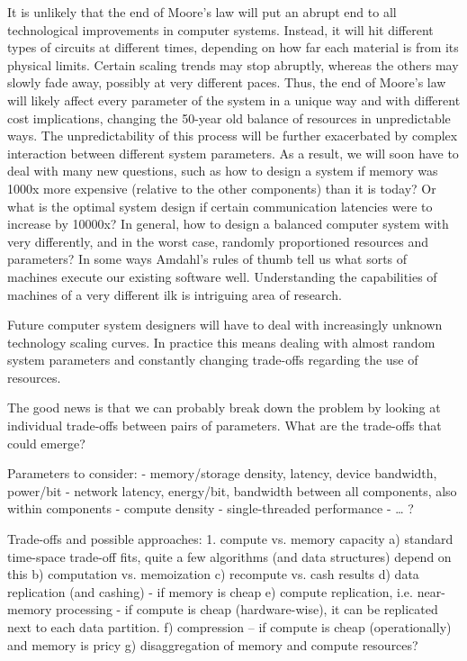 It is unlikely that the end of Moore's law will put an abrupt end to all technological improvements in computer systems. Instead, it will hit different types of circuits at different times, depending on how far each material is from its physical limits. Certain scaling trends may stop abruptly, whereas the others may slowly fade away, possibly at very different paces. Thus, the end of Moore's law will likely affect every parameter of the system in a unique way and with different cost implications, changing the 50-year old balance of resources in unpredictable ways. The unpredictability of this process will be further exacerbated by complex interaction between different system parameters. As a result, we will soon have to deal with many new questions, such as how to design a system if memory was 1000x more expensive (relative to the other components) than it is today? Or what is the optimal system design if certain communication latencies were to increase by 10000x? In general, how to design a balanced computer system with very differently, and in the worst case, randomly proportioned resources and parameters? In some ways Amdahl's rules of thumb tell us what sorts of machines execute our existing software well.  Understanding the capabilities of machines of a very different ilk is intriguing area of research.

Future computer system designers will have to deal with increasingly unknown technology scaling curves. In practice this means dealing with almost random system parameters and constantly changing trade-offs regarding the use of resources. 

The good news is that we can probably break down the problem by looking at individual trade-offs between pairs of parameters. What are the trade-offs that could emerge? 

Parameters to consider:
- memory/storage density, latency, device bandwidth, power/bit
- network latency, energy/bit, bandwidth between all components, also within components
- compute density
- single-threaded performance
- … ?


Trade-offs and possible approaches:
1. compute vs. memory capacity
   a) standard time-space trade-off fits, quite a few algorithms (and data structures) depend on this
   b) computation vs. memoization 
   c) recompute vs. cash results
   d) data replication (and cashing) - if memory is cheap
   e) compute replication, i.e. near-memory processing - if compute is cheap (hardware-wise), it can be replicated next to each data partition.
   f) compression -- if compute is cheap (operationally) and memory is pricy
   g) disaggregation of memory and compute resources?

